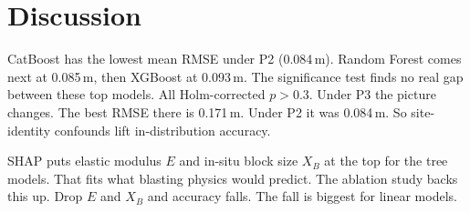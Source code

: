\documentclass[conference]{IEEEtran}
\begin{document}
\begin{table}[t]
\centering
\caption{Ablation: effect of feature subsets (mean $\pm$ std, protocol P2)}
\label{tab:ablations}
\footnotesize
{}
\end{table}













\section{Discussion}
CatBoost has the lowest mean RMSE under P2 (0.084\,m). Random Forest comes next at 0.085\,m, then XGBoost at 0.093\,m. The significance test finds no real gap between these top models. All Holm-corrected $p\!>\!0.3$. Under P3 the picture changes. The best RMSE there is 0.171\,m. Under P2 it was 0.084\,m. So site-identity confounds lift in-distribution accuracy.

SHAP puts elastic modulus $E$ and in-situ block size $X_B$ at the top for the tree models. That fits what blasting physics would predict. The ablation study backs this up. Drop $E$ and $X_B$ and accuracy falls. The fall is biggest for linear models.
\end{document}
